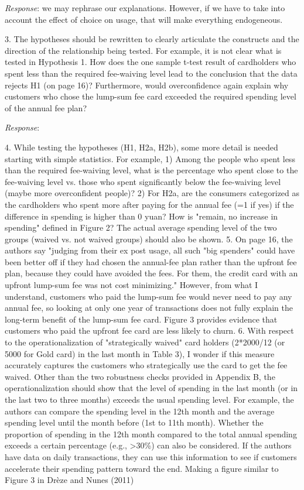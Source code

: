 \documentclass[titlepage,12pt,letterpaper]{article}
\numberwithin{equation}{section}
\begin{document}
\emph{Response}: we may rephrase our explanations. However, if we have to take into account the effect of choice on usage, that will make everything endogeneous. 

3. 	The hypotheses should be rewritten to clearly articulate the constructs and the direction of the relationship being tested. For example, it is not clear what is tested in Hypothesis 1. How does the one sample t-test result of cardholders who spent less than the required fee-waiving level lead to the conclusion that the data rejects H1 (on page 16)? Furthermore, would overconfidence again explain why customers who chose the lump-sum fee card exceeded the required spending level of the annual fee plan?

\emph{Response}: 

4. 	While testing the hypotheses (H1, H2a, H2b), some more detail is needed starting with simple statistics. For example,
1) 	Among the people who spent less than the required fee-waiving level, what is the percentage who spent close to the fee-waiving level vs. those who spent significantly below the fee-waiving level (maybe more overconfident people)?
2) 	For H2a, are the consumers categorized as the cardholders who spent more after paying for the annual fee (=1 if yes) if the difference in spending is higher than 0 yuan? How is "remain, no increase in spending" defined in Figure 2? The actual average spending level of the two groups (waived vs. not waived groups) should also be shown.
5. 	On page 16, the authors say "judging from their ex post usage, all such "big spenders" could have been better off if they had chosen the annual-fee plan rather than the upfront fee plan, because they could have avoided the fees. For them, the credit card with an upfront lump-sum fee was not cost minimizing." However, from what I understand, customers who paid the lump-sum fee would never need to pay any annual fee, so looking at only one year of transactions does not fully explain the long-term benefit of the lump-sum fee card. Figure 3 provides evidence that customers who paid the upfront fee card are less likely to churn.
6. 	With respect to the operationalization of "strategically waived" card holders (2*2000/12 (or 5000 for Gold card) in the last month in Table 3), I wonder if this measure accurately captures the customers who strategically use the card to get the fee waived. Other than the two robustness checks provided in Appendix B, the operationalization should show that the level of spending in the last month (or in the last two to three months) exceeds the usual spending level. For example, the authors can compare the spending level in the 12th month and the average spending level until the month before (1st to 11th month). Whether the proportion of spending in the 12th month compared to the total annual spending exceeds a certain percentage (e.g., >30\%) can also be considered. If the authors have data on daily transactions, they can use this information to see if customers accelerate their spending pattern toward the end. Making a figure similar to Figure 3 in Drèze and Nunes (2011)
\end{document}
